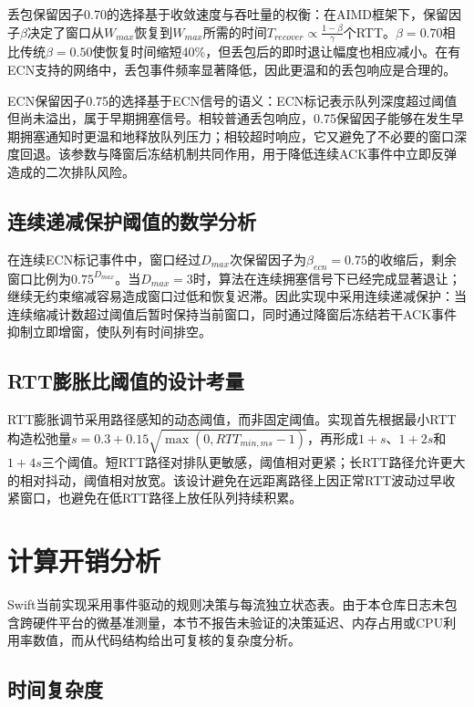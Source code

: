 丢包保留因子0.70的选择基于收敛速度与吞吐量的权衡：在AIMD框架下，保留因子$\beta$决定了窗口从$W_{max}$恢复到$W_{max}$所需的时间$T_{recover} \propto \frac{1-\beta}{\gamma}$个RTT。$\beta=0.70$相比传统$\beta=0.50$使恢复时间缩短40\%，但丢包后的即时退让幅度也相应减小。在有ECN支持的网络中，丢包事件频率显著降低，因此更温和的丢包响应是合理的。

ECN保留因子0.75的选择基于ECN信号的语义：ECN标记表示队列深度超过阈值但尚未溢出，属于早期拥塞信号。相较普通丢包响应，0.75保留因子能够在发生早期拥塞通知时更温和地释放队列压力；相较超时响应，它又避免了不必要的窗口深度回退。该参数与降窗后冻结机制共同作用，用于降低连续ACK事件中立即反弹造成的二次排队风险。

\subsection{连续递减保护阈值的数学分析}

在连续ECN标记事件中，窗口经过$D_{max}$次保留因子为$\beta_{ecn}=0.75$的收缩后，剩余窗口比例为$0.75^{D_{max}}$。当$D_{max}=3$时，算法在连续拥塞信号下已经完成显著退让；继续无约束缩减容易造成窗口过低和恢复迟滞。因此实现中采用连续递减保护：当连续缩减计数超过阈值后暂时保持当前窗口，同时通过降窗后冻结若干ACK事件抑制立即增窗，使队列有时间排空。

\subsection{RTT膨胀比阈值的设计考量}

RTT膨胀调节采用路径感知的动态阈值，而非固定阈值。实现首先根据最小RTT构造松弛量$s = 0.3 + 0.15 \sqrt{\max(0, RTT_{min,ms}-1)}$，再形成$1+s$、$1+2s$和$1+4s$三个阈值。短RTT路径对排队更敏感，阈值相对更紧；长RTT路径允许更大的相对抖动，阈值相对放宽。该设计避免在远距离路径上因正常RTT波动过早收紧窗口，也避免在低RTT路径上放任队列持续积累。

\section{计算开销分析}
\label{sec:overhead}

Swift当前实现采用事件驱动的规则决策与每流独立状态表。由于本仓库日志未包含跨硬件平台的微基准测量，本节不报告未验证的决策延迟、内存占用或CPU利用率数值，而从代码结构给出可复核的复杂度分析。

\subsection{时间复杂度}

